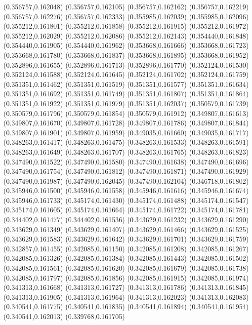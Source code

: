 (0.356757,0.162048)
(0.356757,0.162105)
(0.356757,0.162162)
(0.356757,0.162219)
(0.356757,0.162276)
(0.356757,0.162333)
(0.355985,0.162039)
(0.355985,0.162096)
(0.355212,0.161801)
(0.355212,0.161858)
(0.355212,0.161915)
(0.355212,0.161972)
(0.355212,0.162029)
(0.355212,0.162086)
(0.355212,0.162143)
(0.354440,0.161848)
(0.354440,0.161905)
(0.354440,0.161962)
(0.353668,0.161666)
(0.353668,0.161723)
(0.353668,0.161780)
(0.353668,0.161837)
(0.353668,0.161895)
(0.353668,0.161952)
(0.352896,0.161655)
(0.352896,0.161713)
(0.352896,0.161770)
(0.352124,0.161530)
(0.352124,0.161588)
(0.352124,0.161645)
(0.352124,0.161702)
(0.352124,0.161759)
(0.351351,0.161462)
(0.351351,0.161519)
(0.351351,0.161577)
(0.351351,0.161634)
(0.351351,0.161692)
(0.351351,0.161749)
(0.351351,0.161807)
(0.351351,0.161864)
(0.351351,0.161922)
(0.351351,0.161979)
(0.351351,0.162037)
(0.350579,0.161739)
(0.350579,0.161796)
(0.350579,0.161854)
(0.350579,0.161912)
(0.349807,0.161613)
(0.349807,0.161670)
(0.349807,0.161728)
(0.349807,0.161786)
(0.349807,0.161844)
(0.349807,0.161901)
(0.349807,0.161959)
(0.349035,0.161660)
(0.349035,0.161717)
(0.348263,0.161417)
(0.348263,0.161475)
(0.348263,0.161533)
(0.348263,0.161591)
(0.348263,0.161649)
(0.348263,0.161707)
(0.348263,0.161765)
(0.348263,0.161823)
(0.347490,0.161522)
(0.347490,0.161580)
(0.347490,0.161638)
(0.347490,0.161696)
(0.347490,0.161754)
(0.347490,0.161812)
(0.347490,0.161871)
(0.347490,0.161929)
(0.347490,0.161987)
(0.347490,0.162045)
(0.347490,0.162104)
(0.346718,0.161802)
(0.345946,0.161500)
(0.345946,0.161558)
(0.345946,0.161616)
(0.345946,0.161674)
(0.345946,0.161733)
(0.345174,0.161430)
(0.345174,0.161488)
(0.345174,0.161547)
(0.345174,0.161605)
(0.345174,0.161664)
(0.345174,0.161722)
(0.345174,0.161781)
(0.344402,0.161477)
(0.344402,0.161536)
(0.343629,0.161232)
(0.343629,0.161290)
(0.343629,0.161349)
(0.343629,0.161407)
(0.343629,0.161466)
(0.343629,0.161525)
(0.343629,0.161583)
(0.343629,0.161642)
(0.343629,0.161701)
(0.343629,0.161759)
(0.342857,0.161455)
(0.342085,0.161150)
(0.342085,0.161208)
(0.342085,0.161267)
(0.342085,0.161326)
(0.342085,0.161384)
(0.342085,0.161443)
(0.342085,0.161502)
(0.342085,0.161561)
(0.342085,0.161620)
(0.342085,0.161679)
(0.342085,0.161738)
(0.342085,0.161797)
(0.342085,0.161856)
(0.342085,0.161915)
(0.342085,0.161974)
(0.341313,0.161668)
(0.341313,0.161727)
(0.341313,0.161786)
(0.341313,0.161845)
(0.341313,0.161905)
(0.341313,0.161964)
(0.341313,0.162023)
(0.341313,0.162083)
(0.340541,0.161775)
(0.340541,0.161835)
(0.340541,0.161894)
(0.340541,0.161954)
(0.340541,0.162013)
(0.339768,0.161705)
